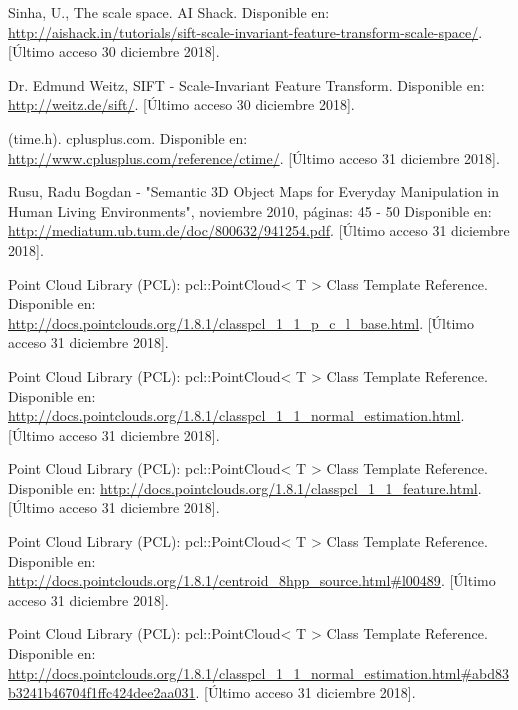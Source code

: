 \begin{thebibliography}{99}
 Sinha, U., The scale space. AI Shack. Disponible en: \url{http://aishack.in/tutorials/sift-scale-invariant-feature-transform-scale-space/}. [Último acceso 30 diciembre 2018].


Dr. Edmund Weitz, SIFT - Scale-Invariant Feature Transform. Disponible en: \url{http://weitz.de/sift/}. [Último acceso 30 diciembre 2018].





(time.h). cplusplus.com. Disponible en: \url{http://www.cplusplus.com/reference/ctime/}. [Último acceso 31 diciembre 2018].



Rusu, Radu Bogdan - "Semantic 3D Object Maps for Everyday Manipulation in Human Living Environments", noviembre 2010, páginas: 45 - 50 Disponible en: \url{http://mediatum.ub.tum.de/doc/800632/941254.pdf}. [Último acceso 31 diciembre 2018].


 Point Cloud Library (PCL): pcl::PointCloud< T > Class Template Reference. Disponible en: \url{http://docs.pointclouds.org/1.8.1/classpcl_1_1_p_c_l_base.html}. [Último acceso 31 diciembre 2018].

 Point Cloud Library (PCL): pcl::PointCloud< T > Class Template Reference. Disponible en: \url{http://docs.pointclouds.org/1.8.1/classpcl_1_1_normal_estimation.html}. [Último acceso 31 diciembre 2018].

 Point Cloud Library (PCL): pcl::PointCloud< T > Class Template Reference. Disponible en: \url{http://docs.pointclouds.org/1.8.1/classpcl_1_1_feature.html}. [Último acceso 31 diciembre 2018].


 Point Cloud Library (PCL): pcl::PointCloud< T > Class Template Reference. Disponible en: \url{http://docs.pointclouds.org/1.8.1/centroid_8hpp_source.html#l00489}. [Último acceso 31 diciembre 2018].


 Point Cloud Library (PCL): pcl::PointCloud< T > Class Template Reference. Disponible en: \url{http://docs.pointclouds.org/1.8.1/classpcl_1_1_normal_estimation.html#abd83b3241b46704f1ffc424dee2aa031}. [Último acceso 31 diciembre 2018].







\end{thebibliography}
